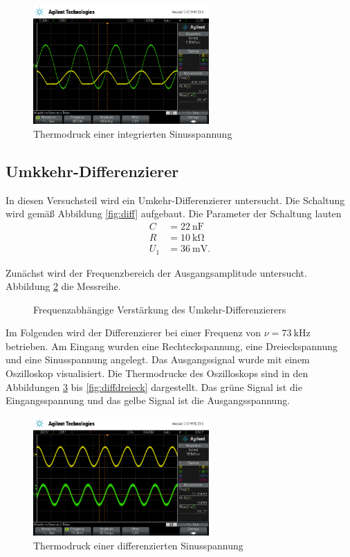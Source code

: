 \begin{figure}
	\centering
	\includegraphics[width=0.6\textwidth]{img/scope_3_int_sin.png}
	\caption{Thermodruck einer integrierten Sinusspannung}
	\label{fig:intsin}
\end{figure}

\subsection{Umkkehr-Differenzierer}
In diesen Versuchsteil wird ein Umkehr-Differenzierer untersucht.
Die Schaltung wird gemäß Abbildung \ref{fig:diff} aufgebaut.
Die Parameter der Schaltung lauten
\begin{align}
	C &= \SI{22}{\nano \farad} \\
	R &= \SI{10}{\kilo \ohm} \\
	U_1 &= \SI{36}{\milli \volt}.
\end{align}

Zunächst wird der Frequenzbereich der Ausgangsamplitude untersucht.
Abbildung \ref{fig:plotdiff} die Messreihe.
\begin{figure}
	\centering
	\resizebox{\pltwidth}{!}{
		
	}
	\caption{Frequenzabhängige Verstärkung des Umkehr-Differenzierers}
	\label{fig:plotdiff}
\end{figure}

Im Folgenden wird der Differenzierer bei einer Frequenz von $\nu = \SI{73}{\kilo \hertz}$ betrieben.
Am Eingang wurden eine Rechteckspannung, eine Dreieckspannung und eine Sinusspannung angelegt.
Das Ausgangssignal wurde mit einem Oszilloskop visualisiert.
Die Thermodrucke des Oszilloskops sind in den Abbildungen \ref{fig:diffsin} bis \ref{fig:diffdreieck} dargestellt.
Das grüne Signal ist die Eingangsspannung und das gelbe Signal ist die Ausgangsspannung.

\begin{figure}
	\centering
	\includegraphics[width=0.6\textwidth]{img/scope_4_diff_sin.png}
	\caption{Thermodruck einer differenzierten Sinusspannung}
	\label{fig:diffsin}
\end{figure}

